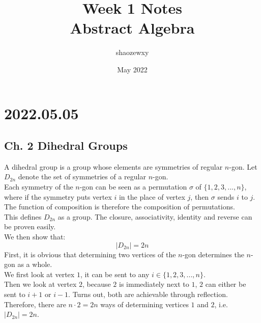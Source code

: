 \documentclass{article}
\title{Week 1 Notes\\
\large{Abstract Algebra}}
\author{shaozewxy }
\date{May 2022}
\begin{document}
\maketitle

\setcounter{secnumdepth}{0}
\section{2022.05.05}
\subsection{Ch. 2 Dihedral Groups}
A dihedral group is a group whose elements are symmetries of regular $n$-gon. Let $D_{2n}$ denote the set of symmetries of a regular $n$-gon.\\
Each symmetry of the $n$-gon can be seen as a permutation $\sigma$ of $\{1,2,3,...,n\}$, where if the symmetry puts vertex $i$ in the place of vertex $j$, then $\sigma$ sends $i$ to $j$. The function of composition is therefore the composition of permutations.\\
This defines $D_{2n}$ as a group. The closure, associativity, identity and reverse can be proven easily.\\
We then show that:
\begin{equation*}
    |D_{2n}| = 2n
\end{equation*}
First, it is obvious that determining two vertices of the $n$-gon determines the $n$-gon as a whole.\\
We first look at vertex $1$, it can be sent to any $i \in \{1,2,3,...,n\}$.\\
Then we look at vertex $2$, because $2$ is immediately next to $1$, $2$ can either be sent to $i+1$ or $i-1$. Turns out, both are achievable through reflection.\\
Therefore, there are $n \cdot 2 = 2n$ ways of determining vertices $1$ and $2$, i.e. $|D_{2n}|=2n$.\\
\end{document}
